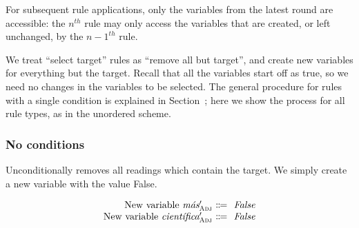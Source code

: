 For subsequent rule applications, only the variables from the latest round are accessible: the $n^{th}$ rule may only access the variables that are created, or left unchanged, by the $n-1^{th}$ rule. 

We treat ``{\sc select} target'' rules as ``{\sc remove} all but target'', and create new variables for everything but the target. Recall that all the variables start off as true, so we need no changes in the variables to be selected. The general procedure for rules with a single condition is explained in Section~; here we show the process for all rule types, as in the unordered scheme.



\subsubsection{No conditions} 


 Unconditionally removes all readings which contain the target. We simply create a new variable with the value False.

\begin{equation}
\centering
%
\begin{array}{r @{~\eqdef~} l}
    \text{New variable } \mas{}'_\adj         & \text{ \em False} \\
    \text{New variable } \cientifica{}'_\adj  & \text{ \em False} \\
  \end{array}
\end{equation}

